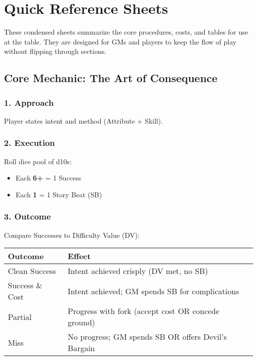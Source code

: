 
\chapter{Quick Reference Sheets}
\label{app:quickref}

These condensed sheets summarize the core procedures, costs, and tables for use at the table. They are designed for GMs and players to keep the flow of play without flipping through sections.

\section{Core Mechanic: The Art of Consequence}

\subsection*{1. Approach}
Player states intent and method (Attribute + Skill).

\subsection*{2. Execution}
Roll dice pool of d10s:
\begin{itemize}
  \item Each \textbf{6+} = 1 Success
  \item Each \textbf{1} = 1 Story Beat (SB) 
\end{itemize}

\subsection*{3. Outcome}
Compare Successes to Difficulty Value (DV):

\begin{center}
\begin{tabular}{ll}
\toprule
\textbf{Outcome} & \textbf{Effect} \\
\midrule
Clean Success & Intent achieved crisply (DV met, no SB) \\
Success \& Cost & Intent achieved; GM spends SB for complications \\
Partial & Progress with fork (accept cost OR concede ground) \\
Miss & No progress; GM spends SB OR offers Devil's Bargain \\
\bottomrule
\end{tabular}
\end{center}

